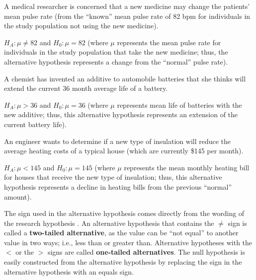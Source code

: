 \documentclass[10pt,openany]{book}\usepackage[]{graphicx}\usepackage[]{color}
\begin{document}
\begin{Enumerate}
  \item A medical researcher is concerned that a new medicine may change the patients' mean pulse rate (from the ``known'' mean pulse rate of 82 bpm for individuals in the study population not using the new medicine).
  \begin{Itemize}
    \item $H_{A}:\mu\neq82$ and $H_{0}:\mu=82$ (where $\mu$ represents the mean pulse rate for individuals in the study population that take the new medicine; thus, the alternative hypothesis represents a change from the ``normal'' pulse rate).
  \end{Itemize}
   \item A chemist has invented an additive to automobile batteries that she thinks will extend the current 36 month average life of a battery.
  \begin{Itemize}
    \item $H_{A}:\mu>36$ and $H_{0}:\mu=36$ (where $\mu$ represents mean life of batteries with the new additive; thus, this alternative hypothesis represents an extension of the current battery life).
  \end{Itemize}
  \item An engineer wants to determine if a new type of insulation will reduce the average heating costs of a typical house (which are currently \$145 per month).
   \begin{Itemize}
    \item $H_{A}:\mu<145$ and $H_{0}:\mu=145$ (where $\mu$ represents the mean monthly heating bill for houses that receive the new type of insulation; thus, this alternative hypothesis represents a decline in heating bills from the previous ``normal'' amount).
  \end{Itemize}
\end{Enumerate}

The sign used in the alternative hypothesis comes directly from the wording of the research hypothesis .  An alternative hypothesis that contains the $\neq$ sign is called a \textbf{two-tailed alternative}, as the value can be ``not equal'' to another value in two ways; i.e., less than or greater than.  Alternative hypotheses with the $<$ or the $>$ signs are called \textbf{one-tailed alternatives}.  The null hypothesis is easily constructed from the alternative hypothesis by replacing the sign in the alternative hypothesis with an equals sign.
\end{document}
